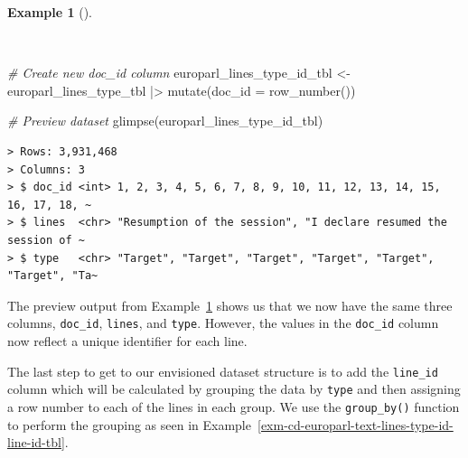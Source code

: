 \documentclass[
  letterpaper,
  DIV=11,
  numbers=noendperiod]{scrreport}
\newenvironment{Shaded}{\begin{snugshade}}{\end{snugshade}}
\newcommand{\AttributeTok}[1]{\textcolor[rgb]{0.00,0.00,0.00}{#1}}
\newcommand{\CommentTok}[1]{\textcolor[rgb]{0.00,0.00,0.00}{\textit{#1}}}
\newcommand{\FunctionTok}[1]{\textcolor[rgb]{0.00,0.00,0.00}{#1}}
\newcommand{\NormalTok}[1]{\textcolor[rgb]{0.00,0.00,0.00}{#1}}
\newcommand{\OtherTok}[1]{\textcolor[rgb]{0.00,0.00,0.00}{#1}}
\newcommand{\SpecialCharTok}[1]{\textcolor[rgb]{0.00,0.00,0.00}{#1}}
\theoremstyle{definition}
\newtheorem{example}{Example}[chapter]
\theoremstyle{remark}
\begin{document}
\begin{example}[]\protect\hypertarget{exm-cd-europarl-text-lines-type-id-tbl}{}\label{exm-cd-europarl-text-lines-type-id-tbl}

~

\begin{Shaded}
\begin{Highlighting}[]
\CommentTok{\# Create new \textasciigrave{}doc\_id\textasciigrave{} column}
\NormalTok{europarl\_lines\_type\_id\_tbl }\OtherTok{\textless{}{-}} 
\NormalTok{  europarl\_lines\_type\_tbl }\SpecialCharTok{|\textgreater{}} 
  \FunctionTok{mutate}\NormalTok{(}\AttributeTok{doc\_id =} \FunctionTok{row\_number}\NormalTok{())}

\CommentTok{\# Preview dataset}
\FunctionTok{glimpse}\NormalTok{(europarl\_lines\_type\_id\_tbl)}
\end{Highlighting}
\end{Shaded}

\begin{verbatim}
> Rows: 3,931,468
> Columns: 3
> $ doc_id <int> 1, 2, 3, 4, 5, 6, 7, 8, 9, 10, 11, 12, 13, 14, 15, 16, 17, 18, ~
> $ lines  <chr> "Resumption of the session", "I declare resumed the session of ~
> $ type   <chr> "Target", "Target", "Target", "Target", "Target", "Target", "Ta~
\end{verbatim}

\end{example}

The preview output from
Example~\ref{exm-cd-europarl-text-lines-type-id-tbl} shows us that we
now have the same three columns, \texttt{doc\_id}, \texttt{lines}, and
\texttt{type}. However, the values in the \texttt{doc\_id} column now
reflect a unique identifier for each line.

The last step to get to our envisioned dataset structure is to add the
\texttt{line\_id} column which will be calculated by grouping the data
by \texttt{type} and then assigning a row number to each of the lines in
each group. We use the \texttt{group\_by()} function to perform the
grouping as seen in
Example~\ref{exm-cd-europarl-text-lines-type-id-line-id-tbl}.
\end{document}
